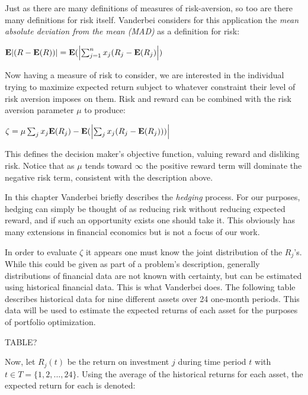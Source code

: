 \documentclass{article}
\begin{document}
Just as there are many definitions of measures of risk-aversion, so too are there many definitions for risk itself. Vanderbei considers for this application the \textit{mean absolute deviation from the mean (MAD)} as a definition for risk:

\begin{center}
    $\mathbf{E}\abs{(R - \mathbf{E}(R))} = \mathbf{E}(\abs{\sum_{j=1}^{n} x_j(R_j-\mathbf{E}(R_j)})$
\end{center}

Now having a measure of risk to consider, we are interested in the individual trying to maximize expected return subject to whatever constraint their level of risk aversion imposes on them. Risk and reward can be combined with the risk aversion parameter $\mu$ to produce:

\begin{center}
    $\zeta = \mu\sum_{j} x_j\mathbf{E}(R_j) - \mathbf{E}(\abs{\sum_{j} x_j(R_j-\mathbf{E}(R_j)))}$
\end{center}

This defines the decision maker's objective function, valuing reward and disliking risk. Notice that as $\mu$ tends toward $\infty$ the positive reward term will dominate the negative risk term, consistent with the description above. 

\begin{notes}
\item In this chapter Vanderbei briefly describes the \textit{hedging} process. For our purposes, hedging can simply be thought of as reducing risk without reducing expected reward, and if such an opportunity exists one should take it. This obviously has many extensions in financial economics but is not a focus of our work.
\end{notes}

In order to evaluate $\zeta$ it appears one must know the joint distribution of the $R_j$'s. While this could be given as part of a problem's description, generally distributions of financial data are not known with certainty, but can be estimated using historical financial data. This is what Vanderbei does. The following table describes historical data for nine different assets over 24 one-month periods. This data will be used to estimate the expected returns of each asset for the purposes of portfolio optimization.

TABLE?

Now, let $R_j(t)$ be the return on investment $j$ during time period $t$ with $t \in T = \{1,2,...,24\}$. Using the average of the historical returns for each asset, the expected return for each is denoted:
\end{document}
